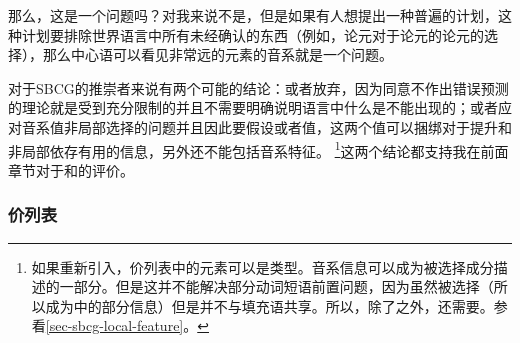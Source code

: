 那么，这是一个问题吗？对我来说不是，但是如果有人想提出一种普遍的计划，这种计划要排除世界语言中所有未经确认的东西（例如，论元对于论元的论元的选择），那么中心语可以看见非常远的元素的音系就是一个问题。

对于SBCG的推崇者来说有两个可能的结论：或者放弃\motherfc，因为同意不作出错误预测的理论就是受到充分限制的并且不需要明确说明语言中什么是不能出现的；或者应对音系值非局部选择的问题并且因此要假设\synsemc 或者\localfc 值，这两个值可以捆绑对于提升和非局部依存有用的信息，另外还不能包括音系特征。 \footnote{%
如果重新引入\synsemc，价列表中的元素可以是类型。音系信息可以成为被选择成分描述的一部分。但是这并不能解决部分动词短语前置问题，因为\lexfc 虽然被选择（所以成为\synsemc 中的部分信息）但是并不与填充语共享。所以，除了\synsemc 之外，还需要\localfc。参看\ref{sec-sbcg-local-feature}。
}这两个结论都支持我在前面章节对于\motherc 和\localc 的评价。

\subsubsection{价列表}
\label{sec-valence-feature-sbcg}

